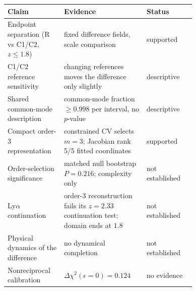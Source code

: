 {\small
\begin{tabular}{p{0.30\linewidth}p{0.44\linewidth}l}
\toprule
Claim & Evidence & Status \\
\midrule
Endpoint separation (R vs C1/C2, $z\le1.8$) & fixed difference fields, scale comparison & supported \\
C1/C2 reference sensitivity & changing references moves the difference only slightly & descriptive \\
Shared common-mode description & common-mode fraction $\ge0.998$ per interval, no $p$-value & descriptive \\
Compact order-3 representation & constrained CV selects $m{=}3$; Jacobian rank 5/5 fitted coordinates & supported \\
Order-selection significance & matched null bootstrap $P{=}0.216$; complexity only & not established \\
Ly$\alpha$ continuation & order-3 reconstruction fails its $z{=}2.33$ continuation test; domain ends at $1.8$ & not established \\
Physical dynamics of the difference & no dynamical completion & not established \\
Nonreciprocal calibration & $\Delta\chi^{2}(\epsilon{=}0)=0.124$ & no evidence \\
\bottomrule
\end{tabular}}

